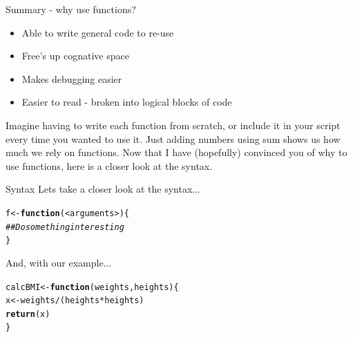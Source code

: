 \documentclass{beamer}\usepackage[]{graphicx}\usepackage[]{color}
\makeatletter
\newcommand{\hlcom}[1]{\textcolor[rgb]{0.678,0.584,0.686}{\textit{#1}}}%
\newcommand{\hlopt}[1]{\textcolor[rgb]{0,0,0}{#1}}%
\newcommand{\hlstd}[1]{\textcolor[rgb]{0.345,0.345,0.345}{#1}}%
\newcommand{\hlkwa}[1]{\textcolor[rgb]{0.161,0.373,0.58}{\textbf{#1}}}%
\newcommand{\hlkwb}[1]{\textcolor[rgb]{0.69,0.353,0.396}{#1}}%
\newcommand{\hlkwc}[1]{\textcolor[rgb]{0.333,0.667,0.333}{#1}}%
\newcommand{\hlkwd}[1]{\textcolor[rgb]{0.737,0.353,0.396}{\textbf{#1}}}%
\newenvironment{kframe}{%
 \def\at@end@of@kframe{}%
 \ifinner\ifhmode%
  \def\at@end@of@kframe{\end{minipage}}%
  \begin{minipage}{\columnwidth}%
 \fi\fi%
 \def\FrameCommand##1{\hskip\@totalleftmargin \hskip-\fboxsep
 \colorbox{shadecolor}{##1}\hskip-\fboxsep
     \hskip-\linewidth \hskip-\@totalleftmargin \hskip\columnwidth}%
 \MakeFramed {\advance\hsize-\width
   \@totalleftmargin\z@ \linewidth\hsize
   \@setminipage}}%
 {\par\unskip\endMakeFramed%
 \at@end@of@kframe}
\newenvironment{knitrout}{}{} %
\makeatother
\begin{document}
\begin{frame}[fragile]{Summary - why use functions?}

\begin{itemize}
\item Able to write general code to re-use
\item Free's up cognative space
\item Makes debugging easier
\item Easier to read - broken into logical blocks of code
\end{itemize}
Imagine having to write each function from scratch, or include it in your script every time you wanted to use it.
\linebreak
Just adding numbers using sum shows us how much we rely on functions.
\linebreak
\linebreak
Now that I have (hopefully) convinced you of why to use functions, here is a closer look at the syntax.
\end{frame}

\begin{frame}[fragile]{Syntax}
Lets take a closer look at the syntax...
\begin{knitrout}
\color{fgcolor}\begin{kframe}
\begin{alltt}
f <- \hlkwd{function}(<arguments>) \{
\hlcom{## Do something interesting}
\}
\end{alltt}
\end{kframe}
\end{knitrout}

And, with our example...
\begin{knitrout}
\color{fgcolor}\begin{kframe}
\begin{alltt}
\hlstd{calcBMI} \hlkwb{<-} \hlkwa{function}\hlstd{(}\hlkwc{weights}\hlstd{,} \hlkwc{heights}\hlstd{) \{}
    \hlstd{x} \hlkwb{<-} \hlstd{weights}\hlopt{/}\hlstd{(heights} \hlopt{*} \hlstd{heights)}
    \hlkwd{return}\hlstd{(x)}
\hlstd{\}}
\end{alltt}
\end{kframe}
\end{knitrout}

\end{frame}
\end{document}
